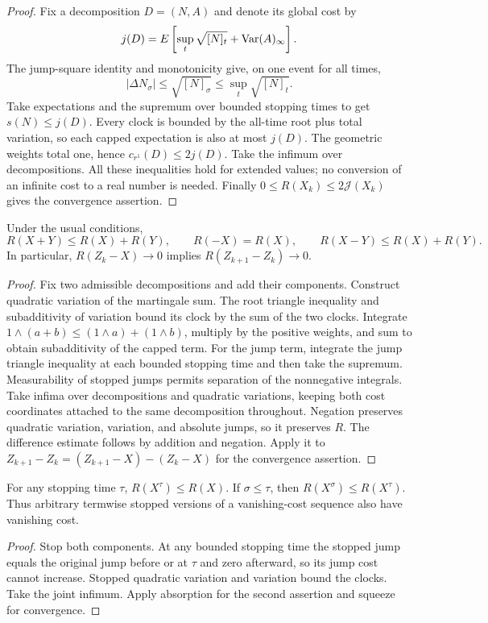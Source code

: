 \begin{proof}
Fix a decomposition $D=(N,A)$ and denote its global cost by
\[
 j(D)=E\left[\sup_t\sqrt{[N]_t}+\operatorname{Var}(A)_\infty\right].
\]
The jump-square identity and monotonicity give, on one event for all times,
\[
 |\Delta N_\sigma|\leq\sqrt{[N]_\sigma}\leq\sup_t\sqrt{[N]_t}.
\]
Take expectations and the supremum over bounded stopping times to get
$s(N)\leq j(D)$. Every clock is bounded by the all-time root plus total
variation, so each capped expectation is also at most $j(D)$.
The geometric weights total one, hence $c_{r^1}(D)\leq2j(D)$.
Take the infimum over decompositions. All these inequalities hold for
extended values; no conversion of an infinite cost to a real number is needed.
Finally $0\leq R(X_k)\leq2\mathcal J(X_k)$ gives the convergence assertion.
\end{proof}
\begin{lemma}
Under the usual conditions,
\[
 R(X+Y)\leq R(X)+R(Y),\qquad R(-X)=R(X),\qquad
 R(X-Y)\leq R(X)+R(Y).
\]
In particular, $R(Z_k-X)\to0$ implies $R(Z_{k+1}-Z_k)\to0$.
\end{lemma}
\begin{proof}
Fix two admissible decompositions and add their components. Construct
quadratic variation of the martingale sum. The root triangle inequality
and subadditivity of variation bound its clock by the sum of the two clocks.
Integrate $1\wedge(a+b)\leq(1\wedge a)+(1\wedge b)$, multiply by the
positive weights, and sum to obtain subadditivity of the capped term.
For the jump term, integrate the jump triangle inequality at each bounded
stopping time and then take the supremum. Measurability of stopped jumps
permits separation of the nonnegative integrals.
Take infima over decompositions and quadratic variations, keeping both
cost coordinates attached to the same decomposition throughout.
Negation preserves quadratic variation, variation, and absolute jumps,
so it preserves $R$. The difference estimate follows by addition and
negation. Apply it to
$Z_{k+1}-Z_k=(Z_{k+1}-X)-(Z_k-X)$ for the convergence assertion.
\end{proof}
\begin{lemma}
For any stopping time $\tau$, $R(X^\tau)\leq R(X)$.
If $\sigma\leq\tau$, then $R(X^\sigma)\leq R(X^\tau)$.
Thus arbitrary termwise stopped versions of a vanishing-cost sequence also
have vanishing cost.
\end{lemma}
\begin{proof}
Stop both components. At any bounded stopping time the stopped jump equals
the original jump before or at $\tau$ and zero afterward, so its jump cost
cannot increase. Stopped quadratic variation and variation bound the clocks.
Take the joint infimum. Apply absorption for the second assertion and squeeze
for convergence.
\end{proof}
